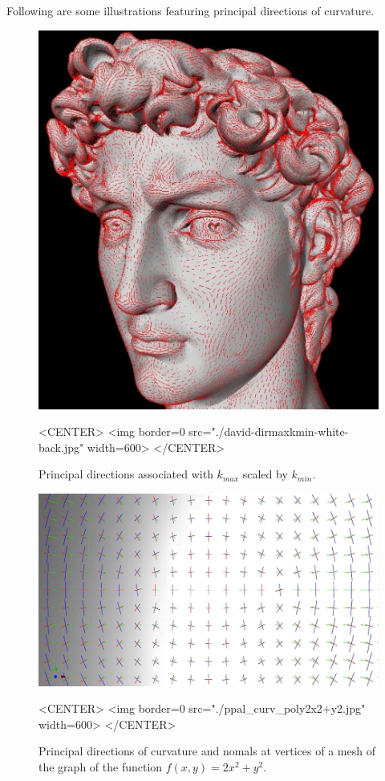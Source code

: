 Following are some illustrations featuring principal directions of curvature.

\begin{figure}[!ht]
\begin{ccTexOnly}
\centerline{
\includegraphics[width=.5\linewidth]{Jet_fitting_3/david-dirmaxkmin-jpg-white-back}}
\end{ccTexOnly}
\caption{Principal directions associated with $k_{max}$ scaled by $k_{min}$.}

\begin{ccHtmlOnly}
<CENTER> <img border=0 src="./david-dirmaxkmin-white-back.jpg" width=600>
</CENTER>
\end{ccHtmlOnly}
\end{figure}

 

\begin{figure}[!ht]
\begin{ccTexOnly}
\centerline{
\includegraphics[width=.5\linewidth]{Jet_fitting_3/ppal_curv_poly2x2+y2}}
\end{ccTexOnly}
\caption{Principal directions of curvature and nomals at vertices of a mesh of the
 graph of the function $f(x,y)=2x^2+y^2$.}

\begin{ccHtmlOnly}
<CENTER> <img border=0 src="./ppal_curv_poly2x2+y2.jpg" width=600>
</CENTER>
\end{ccHtmlOnly}
\end{figure}

